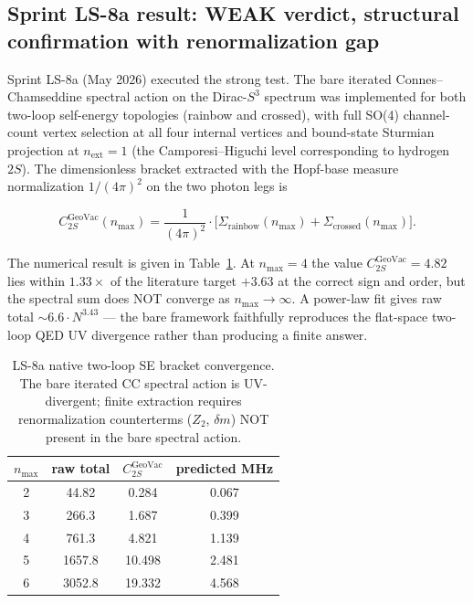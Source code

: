\documentclass[11pt]{article}
\begin{document}
\subsection{Sprint LS-8a result: WEAK verdict, structural confirmation
with renormalization gap}
\label{sec:ls8a_result}

Sprint LS-8a (May 2026) executed the strong test.  The bare iterated
Connes--Chamseddine spectral action on the Dirac-$S^3$ spectrum was
implemented for both two-loop self-energy topologies (rainbow and
crossed), with full SO(4) channel-count vertex selection at all four
internal vertices and bound-state Sturmian projection at $n_\text{ext}
= 1$ (the Camporesi--Higuchi level corresponding to hydrogen $2S$).
The dimensionless bracket extracted with the Hopf-base measure
normalization $1/(4\pi)^2$ on the two photon legs is

\begin{equation}
C_{2S}^{\text{GeoVac}}(n_\text{max}) = \frac{1}{(4\pi)^2} \cdot
\bigl[\Sigma_\text{rainbow}(n_\text{max}) + \Sigma_\text{crossed}(n_\text{max})\bigr].
\end{equation}

The numerical result is given in Table~\ref{tab:ls8a_native}.  At
$n_\text{max} = 4$ the value $C_{2S}^{\text{GeoVac}} = 4.82$ lies
within $1.33\times$ of the literature target $+3.63$ at the correct
sign and order, but the spectral sum does NOT converge as
$n_\text{max} \to \infty$.  A power-law fit gives raw total $\sim 6.6
\cdot N^{3.43}$ — the bare framework faithfully reproduces the
flat-space two-loop QED UV divergence rather than producing a finite
answer.

\begin{table}[ht]
\caption{LS-8a native two-loop SE bracket convergence.  The bare
iterated CC spectral action is UV-divergent; finite extraction
requires renormalization counterterms ($Z_2$, $\delta m$) NOT
present in the bare spectral action.}
\label{tab:ls8a_native}
\centering
\begin{tabular}{|c|c|c|c|}
\hline
$n_\text{max}$ & raw total & $C_{2S}^{\text{GeoVac}}$ & predicted MHz \\
\hline
2 & 44.82 & 0.284 & 0.067 \\
3 & 266.3 & 1.687 & 0.399 \\
4 & 761.3 & 4.821 & 1.139 \\
5 & 1657.8 & 10.498 & 2.481 \\
6 & 3052.8 & 19.332 & 4.568 \\
\hline
\end{tabular}
\end{table}
\end{document}
